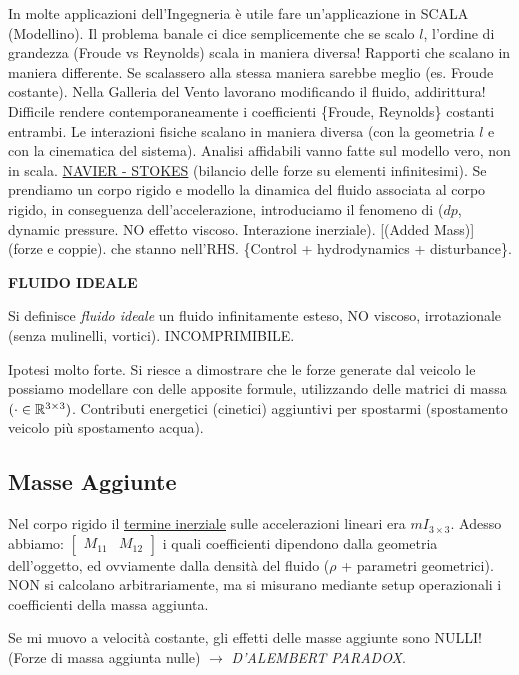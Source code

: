 In molte applicazioni dell'Ingegneria è utile fare un'applicazione in SCALA (Modellino). Il problema banale ci dice semplicemente che se scalo $l$, l'ordine di grandezza (Froude vs Reynolds) scala in maniera diversa! Rapporti che scalano in maniera differente. Se scalassero alla stessa maniera sarebbe meglio (es. Froude costante). Nella Galleria del Vento lavorano modificando il fluido, addirittura! Difficile rendere contemporaneamente i coefficienti \{Froude, Reynolds\} costanti entrambi. Le interazioni fisiche scalano in maniera diversa (con la geometria $l$ e con la cinematica del sistema). Analisi affidabili vanno fatte sul modello vero, non in scala. \underline{NAVIER - STOKES} (bilancio delle forze su elementi infinitesimi). Se prendiamo un corpo rigido e modello la dinamica del fluido associata al corpo rigido, in conseguenza dell'accelerazione, introduciamo il fenomeno di ($dp$, dynamic pressure. NO effetto viscoso. Interazione inerziale). [(Added Mass)] (forze e coppie). che stanno nell'RHS. \{Control + hydrodynamics + disturbance\}.

\begin{defn}{\textbf{FLUIDO IDEALE}}

Si definisce \textit{fluido ideale} un fluido infinitamente esteso, NO viscoso, irrotazionale (senza mulinelli, vortici). INCOMPRIMIBILE.

\end{defn}

Ipotesi molto forte. Si riesce a dimostrare che le forze generate dal veicolo le possiamo modellare con delle apposite formule, utilizzando delle matrici di massa $(\mathord{\cdot}\in\mathbb{R}^{3\times 3})$. Contributi energetici (cinetici) aggiuntivi per spostarmi (spostamento veicolo più spostamento acqua).

\subsection{Masse Aggiunte}

Nel corpo rigido il \underline{termine inerziale} sulle accelerazioni lineari era $mI_{3\times 3}$. Adesso abbiamo: $\begin{bmatrix}M_{11}&M_{12}\end{bmatrix}$ i quali coefficienti dipendono dalla geometria dell'oggetto, ed ovviamente dalla densità del fluido ($\rho$ + parametri geometrici). NON si calcolano arbitrariamente, ma si misurano mediante setup operazionali i coefficienti della massa aggiunta.

Se mi muovo a velocità costante, gli effetti delle masse aggiunte sono NULLI! \newline(Forze di massa aggiunta nulle) $\rightarrow$ \textit{D'ALEMBERT PARADOX}.

